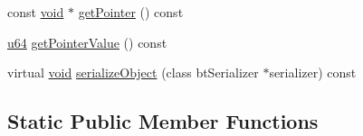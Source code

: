 \begin{DoxyCompactItemize}
\item 
const \mbox{\hyperlink{_thread_8h_af1e856da2e658414cb2456cb6f7ebc66}{void}} $\ast$ \mbox{\hyperlink{classnjli_1_1_physics_constraint_ac4ca71716ed832be357f15f8262c8448}{get\+Pointer}} () const
\item 
\mbox{\hyperlink{_util_8h_ad758b7a5c3f18ed79d2fcd23d9f16357}{u64}} \mbox{\hyperlink{classnjli_1_1_physics_constraint_a4ffddf141a426a5a07d0ac19f1913811}{get\+Pointer\+Value}} () const
\item 
virtual \mbox{\hyperlink{_thread_8h_af1e856da2e658414cb2456cb6f7ebc66}{void}} \mbox{\hyperlink{classnjli_1_1_physics_constraint_a4fc4bcd9d1930911474210c047372fc0}{serialize\+Object}} (class bt\+Serializer $\ast$serializer) const
\end{DoxyCompactItemize}
\subsection*{Static Public Member Functions}
